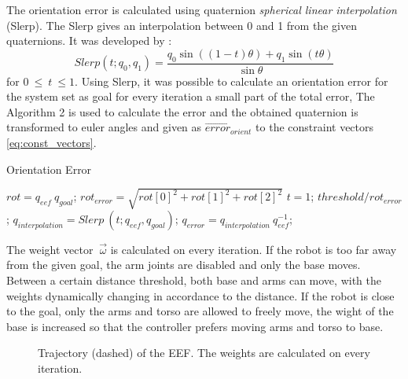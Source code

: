 The orientation error is calculated using quaternion \textit{spherical linear interpolation} (Slerp). The Slerp gives an interpolation between 0 and 1 from the given quaternions. It was developed by \cite{slerp}:
$$ Slerp(t;q_0,q_1)=\dfrac{q_0\sin((1-t)\theta) + q_1\sin(t\theta)}{\sin\theta} 
$$
for $0\ \leq \ t\ \leq 1$. Using Slerp, it was possible to calculate an orientation error for the system set as goal for every iteration a small part of the total error, The Algorithm 2 is used to calculate the error and the obtained quaternion is transformed to euler angles and given as $\vec{error}_{orient}$ to the constraint vectors \ref{eq:const_vectors}.
\begin{algorithm}[t!]
	\caption{Orientation Error}\label{algor:error}
	\begin{algorithmic}[1]
		\vspace{2pt}
		\State $rot = q_{eef}\ q_{goal}$;
		\vspace{3pt}
		\State $rot_{error}  = \sqrt{rot[0]^{2} + rot[1]^{2} + rot[2]^{2}}$
		\vspace{3pt}
		\vspace{2pt}
		\State $t = 1$;
		\vspace{1pt}
		\Else 
		\State $threshold / rot_{error}$;\EndIf
		\vspace{1pt}
		\State $q_{interpolation} = Slerp\ (t;q_{eef},q_{goal})$;
		\vspace{1pt}
		\State $q_{error} = q_{interpolation}\ q_{eef}^{-1}$;
		\vspace{-1pt}
	\end{algorithmic}
\end{algorithm}

The weight vector $\ \vec{\omega}$ is calculated on every iteration. If the robot is too far away from the given goal, the arm joints are disabled and only the base moves. Between a certain distance threshold, both base and arms can move, with the weights dynamically changing in accordance to the distance. If the robot is close to the goal, only the arms and torso are allowed to freely move, the wight of the base is increased so that the controller prefers moving arms and torso to base.
\begin{figure}[H]
	\centering
	\begin{subfigure}[][Isometric view]
		{\texttt{[image: boxy/Trajectory01.png]}}
	\end{subfigure}
	\begin{subfigure}[][Top view]
		{\texttt{[image: boxy/TrajectoryParts.png]}}
	\end{subfigure}
	\vspace{-10pt}
	\caption[Boxy's Trajectory]{Trajectory (dashed) of the EEF. The weights are calculated on every iteration.}
	\vspace{-15pt}
	\label{fig:traj1}
\end{figure}

